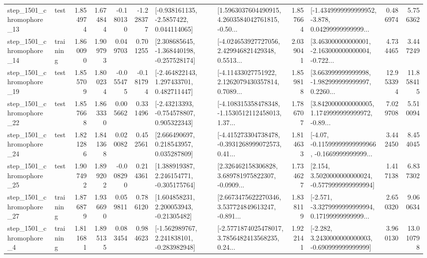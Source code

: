 \begin{tabular}{llrrrrllrlrr}
 step\_1501\_chromophore\_13 &      test &      1.854974 &    1.674844 &     -0.180130 & -1.228377 &     [-0.938161135, -2.5857422, 0.044114065] &  [1.5963037604490915, 4.2603584042761815, -0.50... &       1.857664 &  [-1.4349999999999952, -3.878, 0.04299999999999... &            0.486974 &          5.756362 \\
 step\_1501\_chromophore\_14 &  training &      1.860090 &    1.909793 &      0.049703 &  0.701255 &   [2.308685645, -1.368440198, -0.257528174] &  [-4.024653927727056, 2.429946821429348, 0.5513... &       2.039041 &  [3.463000000000001, -2.163000000000004, -0.722... &            4.734465 &          3.447249 \\
 step\_1501\_chromophore\_19 &      test &      1.855709 &    1.800234 &     -0.055475 & -0.181794 &    [-2.464822143, 1.297433701, 0.482711447] &  [-4.11433027751922, 2.1262079430357814, 0.7089... &       1.859818 &  [3.663999999999998, -1.982999999999997, 0.2260... &           12.953394 &         11.858415 \\
 step\_1501\_chromophore\_22 &      test &      1.857668 &    1.863330 &      0.005662 &  0.331496 &    [-2.43213393, -0.754578807, 0.905322343] &  [-4.108315358478348, -1.1530512112458013, 1.37... &       1.786707 &  [3.8420000000000005, 1.1749999999999972, -0.89... &            7.029708 &          5.510094 \\
 step\_1501\_chromophore\_24 &      test &      1.821286 &    1.841368 &      0.020082 &  0.452561 &     [2.666490697, 0.218543957, 0.035287809] &  [-4.415273304738478, -0.3931268999072573, 0.41... &       1.814633 &  [-4.07, -0.11599999999999966, -0.1669999999999... &            3.442450 &          8.454045 \\
 step\_1501\_chromophore\_25 &      test &      1.907492 &    1.899202 &     -0.008290 &  0.214361 &    [1.388919387, 2.246154771, -0.305175764] &  [2.326462158306828, 3.689781975822307, -0.0909... &       1.734627 &   [2.154, 3.5020000000000024, -0.5779999999999994] &            1.417138 &          6.837302 \\
 step\_1501\_chromophore\_27 &  training &      1.876879 &    1.936690 &      0.059811 &  0.786120 &     [1.604858231, 2.200053943, -0.21305482] &  [2.6673475622270346, 3.537724849613247, -0.891... &       1.838119 &  [-2.571, -3.3279999999999994, 0.17199999999999... &            2.650320 &          9.060634 \\
  step\_1501\_chromophore\_4 &  training &      1.811681 &    1.895135 &      0.083454 &  0.984623 &   [-1.562989767, 2.241838101, -0.283982948] &  [-2.5771874025478017, 3.7856482413568235, 0.24... &       1.922141 &   [-2.282, 3.2430000000000003, -0.690999999999999] &            3.960130 &         13.010798 \\

\end{tabular}
